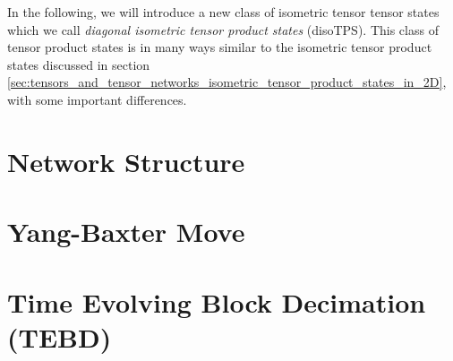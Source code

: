 In the following, we will introduce a new class of isometric tensor tensor states which we call \textit{diagonal isometric tensor product states} (disoTPS). This class of tensor product states is in many ways similar to the isometric tensor product states discussed in section \ref{sec:tensors_and_tensor_networks_isometric_tensor_product_states_in_2D}, with some important differences. 

\section{Network Structure}
\label{sec:disoTPS_network_structure}


\section{Yang-Baxter Move}
\label{sec:disoTPS_yang_baxter_move}


\section{Time Evolving Block Decimation (TEBD)}
\label{sec:disoTPS_TEBD}
